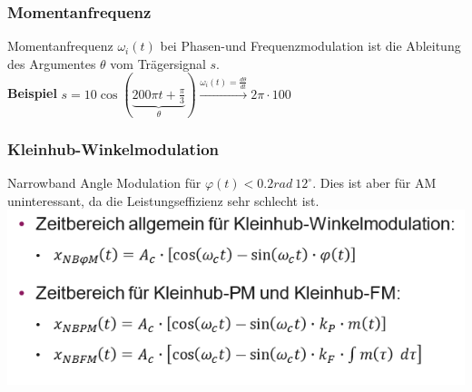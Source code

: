\subsubsection{Momentanfrequenz}
Momentanfrequenz $\omega_i(t)$ bei Phasen-und Frequenzmodulation ist die Ableitung des Argumentes $\theta$ vom Trägersignal $s$.\\ \textbf{Beispiel }$s = 10\cos(\underbrace{200\pi t + \frac{\pi}{3}}_\theta) \xrightarrow{\omega_i(t) = \frac{d\theta}{dt}}  2\pi \cdot 100$

\subsubsection{Kleinhub-Winkelmodulation}
Narrowband Angle Modulation für $\varphi(t) < 0.2rad ~12^\circ$. Dies ist aber für AM uninteressant, da die Leistungseffizienz sehr schlecht ist.
\includegraphics[width=\columnwidth]{Images/screenshot009}


